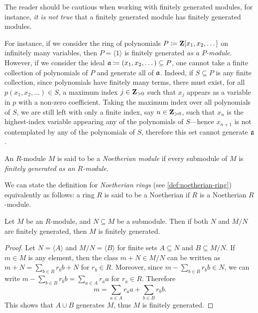 \begin{remark}[Submodules]
    \label{rem:submodules-finitely-generated}
    The reader should be cautious when working with finitely generated modules, for
    instance, \emph{it is not true} that a finitely generated module has finitely
    generated modules.

    For instance, if we consider the ring of polynomials
    \(P \coloneq \mathbf{Z}[x_1, x_2, \dots]\) on infinitely many variables, then
    \(P = \langle 1 \rangle\) is finitely generated \emph{as a
        \(P\)-module}. However, if we consider the ideal
    \(\mathfrak{a} \coloneq (x_1, x_2, \dots) \subseteq P\), one cannot take a finite
    collection of polynomials of \(P\) and generate all of \(\mathfrak{a}\). Indeed, if
    \(S \subseteq P\) is any finite collection, since polynomials have finitely many
    terms, there must exist, for all \(p(x_1, x_2, \dots) \in S\), a maximum index
    \(j \in \mathbf{Z}_{>0}\) such that \(x_j\) appears as a variable in \(p\) with a
    non-zero coefficient. Taking the maximum index over all polynomials of \(S\), we
    are still left with only a finite index, say \(n \in \mathbf{Z}_{>0}\), such that
    \(x_n\) is the highest-index variable appearing any of the polynomials of
    \(S\)---hence \(x_{n+1}\) is not contemplated by any of the polynomials of
    \(S\), therefore this set cannot generate \(\mathfrak{a}\).
\end{remark}

\begin{definition}
    \label{def:noetherian-module}
    An \(R\)-module \(M\) is said to be a \emph{Noetherian module} if every
    submodule of \(M\) is \emph{finitely generated as an \(R\)-module}.
\end{definition}

We can state the definition for \emph{Noetherian rings} (see
\cref{def:noetherian-ring}) equivalently as follows: a ring \(R\) is said to be
a Noetherian if \(R\) is a Noetherian \(R\)-module.

\begin{lemma}
    \label{lem:finitely-generated-from-submodule}
    Let \(M\) be an \(R\)-module, and \(N \subseteq M\) be a submodule. Then if both
    \(N\) and \(M/N\) are finitely generated, then \(M\) is finitely generated.
\end{lemma}

\begin{proof}
    Let \(N = \langle A \rangle\) and \(M/N = \langle B \rangle\) for finite sets
    \(A \subseteq N\) and \(B \subseteq M/N\). If \(m \in M\) is any element, then
    the class \(m + N \in M/N\) can be written as
    \(m + N = \sum_{b \in B} r_b b + N\) for \(r_b \in R\). Moreover, since
    \(m - \sum_{b \in B} r_b b \in N\), we can write
    \(m - \sum_{b \in B} r_b b = \sum_{a \in A} r_a a\) for \(r_a \in R\). Therefore
    \[
        m = \sum_{a \in A} r_a a + \sum_{b \in B} r_b b.
    \]
    This shows that \(A \cup B\) generates \(M\), thus \(M\) is finitely generated.
\end{proof}


